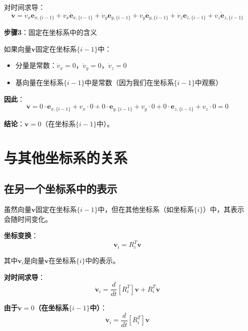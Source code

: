 \documentclass[12pt,a4paper]{article}
\begin{document}
对时间求导：
\begin{equation}
\dot{\mathbf{v}} = \dot{v}_x \mathbf{e}_{x,\{i-1\}} + v_x \dot{\mathbf{e}}_{x,\{i-1\}} + \dot{v}_y \mathbf{e}_{y,\{i-1\}} + v_y \dot{\mathbf{e}}_{y,\{i-1\}} + \dot{v}_z \mathbf{e}_{z,\{i-1\}} + v_z \dot{\mathbf{e}}_{z,\{i-1\}}
\end{equation}

\textbf{步骤3}：固定在坐标系中的含义

如果向量$\mathbf{v}$固定在坐标系$\{i-1\}$中：
\begin{itemize}
\item 分量是常数：$\dot{v}_x = 0$，$\dot{v}_y = 0$，$\dot{v}_z = 0$
\item 基向量在坐标系$\{i-1\}$中是常数（因为我们在坐标系$\{i-1\}$中观察）
\end{itemize}

\textbf{因此}：
\begin{equation}
\dot{\mathbf{v}} = 0 \cdot \mathbf{e}_{x,\{i-1\}} + v_x \cdot 0 + 0 \cdot \mathbf{e}_{y,\{i-1\}} + v_y \cdot 0 + 0 \cdot \mathbf{e}_{z,\{i-1\}} + v_z \cdot 0 = 0
\end{equation}

\textbf{结论}：$\dot{\mathbf{v}} = 0$（在坐标系$\{i-1\}$中）。

\section{与其他坐标系的关系}

\subsection{在另一个坐标系中的表示}

虽然向量$\mathbf{v}$固定在坐标系$\{i-1\}$中，但在其他坐标系（如坐标系$\{i\}$）中，其表示会随时间变化。

\textbf{坐标变换}：
\begin{equation}
\mathbf{v}_i = R_i^T \mathbf{v}
\end{equation}

其中$\mathbf{v}_i$是向量$\mathbf{v}$在坐标系$\{i\}$中的表示。

\textbf{对时间求导}：
\begin{equation}
\dot{\mathbf{v}}_i = \frac{d}{dt}[R_i^T] \mathbf{v} + R_i^T \dot{\mathbf{v}}
\end{equation}

\textbf{由于$\dot{\mathbf{v}} = 0$（在坐标系$\{i-1\}$中）}：
\begin{equation}
\dot{\mathbf{v}}_i = \frac{d}{dt}[R_i^T] \mathbf{v}
\end{equation}
\end{document}
